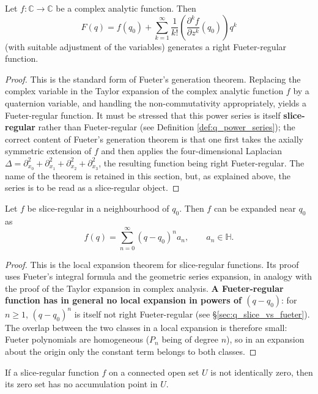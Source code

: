 \begin{theorem}\label{thm:q_fueter_theorem}
Let $f:\mathbb{C}\to\mathbb{C}$ be a complex analytic function. Then
\[
F(q)=f(q_0)+\sum_{k=1}^\infty\frac{1}{k!}\left(\frac{\partial^k f}{\partial z^k}(q_0)\right)q^k
\]
(with suitable adjustment of the variables) generates a right Fueter-regular function.
\end{theorem}

\begin{proof}
This is the standard form of Fueter's generation theorem. Replacing the complex variable in the Taylor expansion of the complex analytic function $f$ by a quaternion variable, and handling the non-commutativity appropriately, yields a Fueter-regular function. It must be stressed that this power series is itself \textbf{slice-regular} rather than Fueter-regular (see Definition \ref{def:q_power_series}); the correct content of Fueter's generation theorem is that one first takes the axially symmetric extension of $f$ and then applies the four-dimensional Laplacian $\Delta=\partial_{x_0}^2+\partial_{x_1}^2+\partial_{x_2}^2+\partial_{x_3}^2$, the resulting function being right Fueter-regular. The name of the theorem is retained in this section, but, as explained above, the series is to be read as a slice-regular object.
\end{proof}

\begin{theorem}\label{thm:q_local_expansion}
Let $f$ be slice-regular in a neighbourhood of $q_0$. Then $f$ can be expanded near $q_0$ as
\[
f(q)=\sum_{n=0}^\infty (q-q_0)^n a_n,\qquad a_n\in\mathbb{H}.
\]
\end{theorem}

\begin{proof}
This is the local expansion theorem for slice-regular functions. Its proof uses Fueter's integral formula and the geometric series expansion, in analogy with the proof of the Taylor expansion in complex analysis. \textbf{A Fueter-regular function has in general no local expansion in powers of $(q-q_0)$}: for $n\ge 1$, $(q-q_0)^n$ is itself not right Fueter-regular (see \S\ref{sec:q_slice_vs_fueter}). The overlap between the two classes in a local expansion is therefore small: Fueter polynomials are homogeneous ($P_n$ being of degree $n$), so in an expansion about the origin only the constant term belongs to both classes.
\end{proof}

\begin{corollary}\label{cor:q_zero_isolated}
If a slice-regular function $f$ on a connected open set $U$ is not identically zero, then its zero set has no accumulation point in $U$.
\end{corollary}

